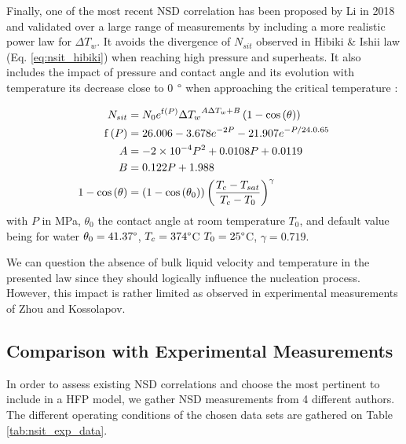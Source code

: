 \npar

Finally, one of the most recent NSD correlation has been proposed by Li \etal in 2018 \cite{li_development_2018} and validated over a large range of measurements by including a more realistic power law for $\Delta T_{w}$. It avoids the divergence of $N_{sit}$ observed in Hibiki \& Ishii law (Eq. \ref{eq:nsit_hibiki}) when reaching high pressure and superheats. It also includes the impact of pressure and contact angle and its evolution with temperature \eg its decrease close to 0 $\degree$ when approaching the critical temperature \cite{song_temperature_2021}:


\begin{align}
N_{sit} &= N_{0}e^{\mathrm{f}\parth{P}} {\Delta T_{w}}^{A\Delta T_{w} + B} \parth{1- \cos{\theta}}
\label{eq:nsit_li}\\
%
\mathrm{f}\parth{P} &= 26.006 - 3.678 e^{-2P} - 21.907e^{-P / 24.0.65}\\
%
A &= -2\times 10^{-4} P^{2} + 0.0108P + 0.0119\\
%
B &= 0.122P +1.988\\
%
1-\cos{\theta} &= \parth{1-\cos{\theta_{0}}}\parth{\frac{T_{c}-T_{sat}}{T_{c}-T_{0}}}^{\gamma}
\end{align}
with $P$ in MPa, $\theta_{0}$ the contact angle at room temperature $T_{0}$, and default value being for water $\theta_{0}=41.37 \degree$, $T_{c}=374 \degree$C $T_{0}=25\degree$C, $\gamma = 0.719$.

\begin{remark*}{}
We can question the absence of bulk liquid velocity and temperature in the presented law since they should logically influence the nucleation process. However, this impact is rather limited as observed in experimental measurements of Zhou \etal and Kossolapov.
\end{remark*}

\subsection{Comparison with Experimental Measurements}

In order to assess existing NSD correlations and choose the most pertinent to include in a HFP model, we gather NSD measurements from 4 different authors. The different operating conditions of the chosen data sets are gathered on Table \ref{tab:nsit_exp_data}.


